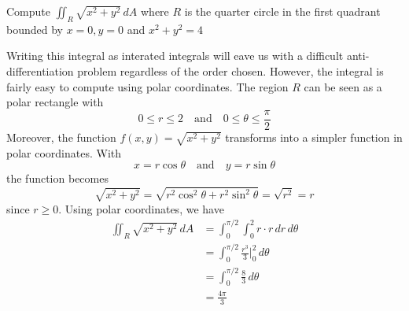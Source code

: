 \documentclass[handout]{ximera}
\begin{document}
\begin{example}[Example 1]
Compute $\iint_R \sqrt{x^2 + y^2} \, dA$ where $R$ is the quarter circle in the first quadrant bounded by $x=0, y=0$ and $x^2 + y^2 = 4$

\begin{image}
\end{image}
Writing this integral as interated integrals will eave us with a difficult anti-differentiation problem regardless of the order chosen.
However, the integral is fairly easy to compute using polar coordinates. The region $R$ can be seen as a polar rectangle with 
\[
0\leq r \leq 2 \quad \text{and} \quad 0 \leq \theta \leq \frac{\pi}{2}
\]
Moreover, the function $f(x,y) = \sqrt{x^2 + y^2}$ transforms into a simpler function in polar coordinates. With
\[
x = r\cos \theta \quad \text{and} \quad y = r\sin \theta
\]
the function becomes
\[
\sqrt{x^2 +y^2} = \sqrt{r^2 \cos^2 \theta + r^2 \sin^2 \theta} = \sqrt{r^2} = r
\]
since $r \geq 0$.
Using polar coordinates, we have
\begin{align*}
\iint_R \sqrt{x^2 + y^2} \, dA & = \int_0^{\pi/2} \int_0^2 r \cdot r \, dr \, d\theta\\
                 & = \int_0^{\pi/2}  \frac{r^3}{3} \bigg|_{0}^2 \, d\theta\\
                 & = \int_0^{\pi/2} \frac83\, d\theta\\
                 &= \frac{4\pi}{3}
\end{align*}  

\end{example}
\end{document}
